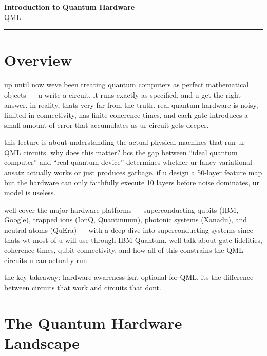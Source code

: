 \documentclass[11pt,a4paper]{article}
\theoremstyle{definition}
\theoremstyle{remark}
\begin{document}
\begin{center}
    {\LARGE \textbf{Introduction to Quantum Hardware}}\\[8pt]
    {\large QML}\\[12pt]
    \hrule
\end{center}

\vspace{12pt}
\tableofcontents
\newpage

\section{Overview}

up until now weve been treating quantum computers as perfect mathematical objects --- u write a circuit, it runs exactly as specified, and u get the right answer. in reality, thats very far from the truth. real quantum hardware is noisy, limited in connectivity, has finite coherence times, and each gate introduces a small amount of error that accumulates as ur circuit gets deeper.

this lecture is about understanding the actual physical machines that run ur QML circuits. why does this matter? bcs the gap between ``ideal quantum computer'' and ``real quantum device'' determines whether ur fancy variational ansatz actually works or just produces garbage. if u design a 50-layer feature map but the hardware can only faithfully execute 10 layers before noise dominates, ur model is useless.

well cover the major hardware platforms --- superconducting qubits (IBM, Google), trapped ions (IonQ, Quantinuum), photonic systems (Xanadu), and neutral atoms (QuEra) --- with a deep dive into superconducting systems since thats wt most of u will use through IBM Quantum. well talk about gate fidelities, coherence times, qubit connectivity, and how all of this constrains the QML circuits u can actually run.

the key takeaway: hardware awareness isnt optional for QML. its the difference between circuits that work and circuits that dont.

\section{The Quantum Hardware Landscape}
\end{document}
